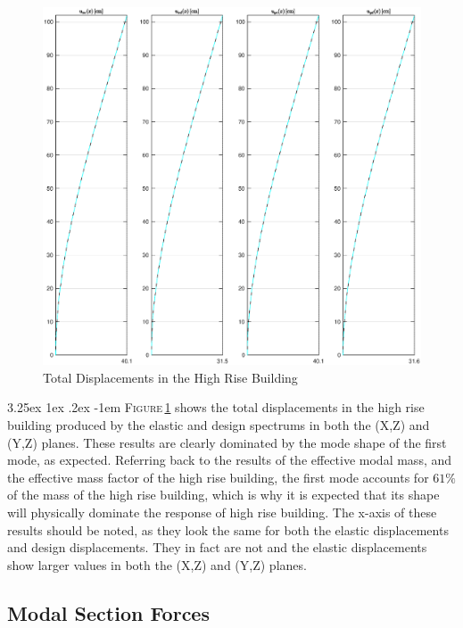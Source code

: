\documentclass[11pt,a4paper,titlepage]{report}
\makeatletter
\renewcommand\paragraph{\@startsection{paragraph}{5}{\z@}%
  {3.25ex \@plus1ex \@minus.2ex}%
  {-1em}%
  {\normalfont\normalsize\bfseries}}
\makeatother
\begin{document}
\begin{figure}
    \centering
    \includegraphics[width=16cm]{Total_Displacements_HR.eps}
    \caption{Total Displacements in the High Rise Building}
    \label{fig:I.2 total displacements HR}
\end{figure}
\paragraph{}\textsc{Figure}\,\ref{fig:I.2 total displacements HR} shows the total displacements in the high rise building produced by the elastic and design spectrums in both the (X,Z) and (Y,Z) planes. These results are clearly dominated by the mode shape of the first mode, as expected. Referring back to the results of the effective modal mass, and the effective mass factor of the high rise building, the first mode accounts for $61\%$ of the mass of the high rise building, which is why it is expected that its shape will physically dominate the response of high rise building. The x-axis of these results should be noted, as they look the same for both the elastic displacements and design displacements. They in fact are not and the elastic displacements show larger values in both the (X,Z) and (Y,Z) planes. 
\subsection{Modal Section Forces}
\end{document}
